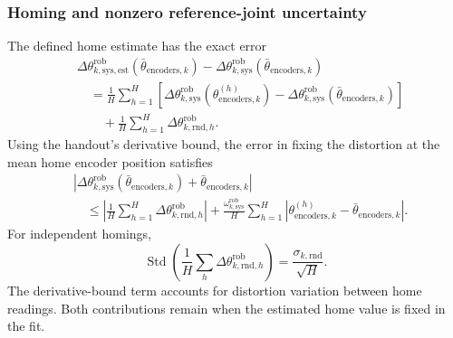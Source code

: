 \documentclass[../main.tex]{subfiles}
\begin{document}
\subsubsection{Homing and nonzero reference-joint uncertainty}
The defined home estimate has the exact error
\begin{equation*}
\begin{aligned}
&\Delta\theta^{\mathrm{rob}}_{k,\mathrm{sys},\mathrm{est}}(\bar\theta_{\mathrm{encoders},k})
-\Delta\theta^{\mathrm{rob}}_{k,\mathrm{sys}}(\bar\theta_{\mathrm{encoders},k})\\
&\quad=\frac1H\sum_{h=1}^{H}
\left[\Delta\theta^{\mathrm{rob}}_{k,\mathrm{sys}}(\theta_{\mathrm{encoders},k}^{(h)})
-\Delta\theta^{\mathrm{rob}}_{k,\mathrm{sys}}(\bar\theta_{\mathrm{encoders},k})\right]\\
&\qquad+\frac1H\sum_{h=1}^{H}\Delta\theta^{\mathrm{rob}}_{k,\mathrm{rnd},h}.
\end{aligned}
\end{equation*}
Using the handout's derivative bound, the error in fixing the distortion at the mean home encoder position satisfies
\begin{equation*}
\begin{aligned}
&\left|\Delta\theta^{\mathrm{rob}}_{k,\mathrm{sys}}(\bar\theta_{\mathrm{encoders},k})
+\bar\theta_{\mathrm{encoders},k}\right|\\
&\quad\leq\left|\frac1H\sum_{h=1}^{H}\Delta\theta^{\mathrm{rob}}_{k,\mathrm{rnd},h}\right|
+\frac{\omega^{\mathrm{rob}}_{k,\mathrm{sys}}}{H}
\sum_{h=1}^{H}\left|\theta_{\mathrm{encoders},k}^{(h)}-\bar\theta_{\mathrm{encoders},k}\right|.
\end{aligned}
\end{equation*}
For independent homings,
\begin{equation*}
\operatorname{Std}\!\left(\frac1H\sum_h\Delta\theta^{\mathrm{rob}}_{k,\mathrm{rnd},h}\right)
=\frac{\sigma_{k,\mathrm{rnd}}}{\sqrt H}.
\end{equation*}
The derivative-bound term accounts for distortion variation between home readings. Both contributions remain when the estimated home value is fixed in the fit.
\end{document}
